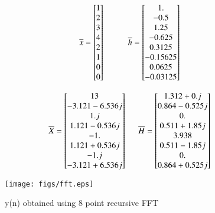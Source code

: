 \documentclass[journal,12pt,twocolumn]{IEEEtran}
\renewcommand\thesection{\arabic{section}}
\begin{document}
\begin{enumerate}[label=\thesection.\arabic*.,ref=\thesection.\theenumi]
\begin{equation}
\overline{x} =
\begin{bmatrix}
1\\2\\3\\4\\2\\1\\0\\0
\end{bmatrix} \hspace{10mm} 
\overline{h} =
\begin{bmatrix}
1. \\     -0.5 \\     1.25 \\   -0.625 \\   0.3125 \\ -0.15625 \\ 0.0625\\  -0.03125
\end{bmatrix}
\end{equation}


\begin{equation}
    \overline{X} =
\begin{bmatrix}
 13 \\   -3.121-6.536j \\  1.j \\     1.121-0.536j \\ -1.\\1.121+0.536j\\ -1.j\\    -3.121+6.536j
\end{bmatrix}
 \hspace{5mm}  \overline{H} =
\begin{bmatrix}
1.312+0.j \\    0.864-0.525j \\ 0.  \\    0.511+1.85j \\ 3.938 \\
 0.511-1.85j \\  0.  \\    0.864+0.525j
\end{bmatrix}
\end{equation}

\begin{figure}[!ht]

	\texttt{[image: figs/fft.eps]}
	\caption{y(n) obtained using 8 point recursive FFT}
\end{figure}
\bigskip


\end{enumerate}
\end{document}
